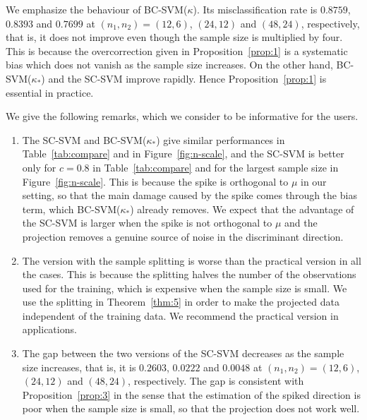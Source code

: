 We emphasize the behaviour of BC-SVM($\kappa$). Its misclassification rate is
$0.8759$, $0.8393$ and $0.7699$ at $(n_1,n_2)=(12,6)$, $(24,12)$ and $(48,24)$,
respectively, that is, it does not improve even though the sample size is
multiplied by four. This is because the overcorrection given in
Proposition~\ref{prop:1} is a systematic bias which does not vanish as the sample
size increases. On the other hand, BC-SVM($\kappa_*$) and the SC-SVM improve
rapidly. Hence Proposition~\ref{prop:1} is essential in practice.

We give the following remarks, which we consider to be informative for the users.

\begin{enumerate}[label=(\roman*)]
\item The SC-SVM and BC-SVM($\kappa_*$) give similar performances in
Table~\ref{tab:compare} and in Figure~\ref{fig:n-scale}, and the SC-SVM is better
only for $c=0.8$ in Table~\ref{tab:compare} and for the largest sample size in
Figure~\ref{fig:n-scale}. This is because the spike is orthogonal to $\mu$ in our
setting, so that the main damage caused by the spike comes through the bias term,
which BC-SVM($\kappa_*$) already removes. We expect that the advantage of the
SC-SVM is larger when the spike is not orthogonal to $\mu$ and the projection
removes a genuine source of noise in the discriminant direction.

\item The version with the sample splitting is worse than the practical version in
all the cases. This is because the splitting halves the number of the observations
used for the training, which is expensive when the sample size is small. We use
the splitting in Theorem~\ref{thm:5} in order to make the projected data independent
of the training data. We recommend the practical version in applications.

\item The gap between the two versions of the SC-SVM decreases as the sample size
increases, that is, it is $0.2603$, $0.0222$ and $0.0048$ at
$(n_1,n_2)=(12,6)$, $(24,12)$ and $(48,24)$, respectively. The gap is consistent
with Proposition~\ref{prop:3} in the sense that the estimation of the spiked
direction is poor when the sample size is small, so that the projection does not
work well.
\end{enumerate}
